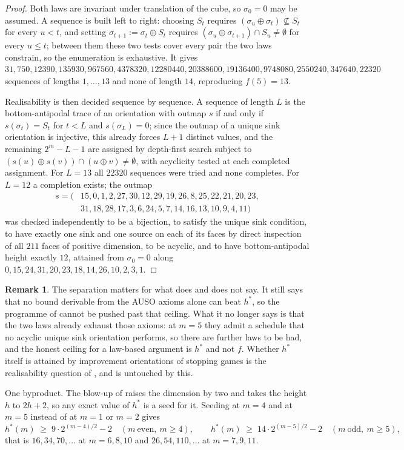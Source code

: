 \documentclass[11pt]{article}
\theoremstyle{plain}
\theoremstyle{definition}
\newtheorem{remark}[theorem]{Remark}
\begin{document}
\begin{proof}
Both laws are invariant under translation of the cube, so $\sigma_0=0$ may be
assumed. A sequence is built left to right: choosing $S_t$ requires
$(\sigma_u\oplus\sigma_t)\not\subseteq S_t$ for every $u<t$, and setting
$\sigma_{t+1}:=\sigma_t\oplus S_t$ requires
$(\sigma_u\oplus\sigma_{t+1})\cap S_u\ne\emptyset$ for every $u\le t$; between
them these two tests cover every pair the two laws constrain, so the
enumeration is exhaustive. It gives
$31,750,12390,135930,967560,4378320,12280440,20388600,19136400,9748080,2550240,
347640,22320$ sequences of lengths $1,\dots,13$ and none of length $14$,
reproducing $f(5)=13$.

Realisability is then decided sequence by sequence. A sequence of length $L$ is
the bottom-antipodal trace of an orientation with outmap $s$ if and only if
$s(\sigma_t)=S_t$ for $t<L$ and $s(\sigma_L)=0$; since the outmap of a unique
sink orientation is injective, this already forces $L+1$ distinct values, and
the remaining $2^{m}-L-1$ are assigned by depth-first search subject to
$(s(u)\oplus s(v))\cap(u\oplus v)\ne\emptyset$, with acyclicity tested at each
completed assignment. For $L=13$ all $22320$ sequences were tried and none
completes. For $L=12$ a completion exists; the outmap
\[
  \begin{aligned}
  s=(&15,0,1,2,27,30,12,29,19,26,8,25,22,21,20,23,\\
     &31,18,28,17,3,6,24,5,7,14,16,13,10,9,4,11)
  \end{aligned}
\]
was checked independently to be a bijection, to satisfy the unique sink
condition, to have exactly one sink and one source on each of its faces by
direct inspection of all $211$ faces of positive dimension, to be acyclic, and to have
bottom-antipodal height exactly $12$, attained from $\sigma_0=0$ along
$0,15,24,31,20,23,18,14,26,10,2,3,1$.
\end{proof}

\begin{remark}\label{rem:hstar-five}
The separation matters for what  does and does not say. It
still says that no bound derivable from the AUSO axioms alone can beat
$h^{\ast}$, so the programme of  cannot be pushed past that
ceiling. What it no longer says is that the two laws already exhaust those
axioms: at $m=5$ they admit a schedule that no acyclic unique sink orientation
performs, so there are further laws to be had, and the honest ceiling for a
law-based argument is $h^{\ast}$ and not $f$. Whether $h^{\ast}$ itself is
attained by improvement orientations of stopping games is the realisability
question of , and is untouched by this.

One byproduct. The blow-up of  raises the dimension by two
and takes the height $h$ to $2h+2$, so any exact value of $h^{\ast}$ is a seed
for it. Seeding at $m=4$ and at $m=5$ instead of at $m=1$ or $m=2$ gives
\[
  h^{\ast}(m)\;\ge\;9\cdot2^{(m-4)/2}-2\quad(m\ \text{even},\ m\ge4),
  \qquad
  h^{\ast}(m)\;\ge\;14\cdot2^{(m-5)/2}-2\quad(m\ \text{odd},\ m\ge5),
\]
that is $16,34,70,\dots$ at $m=6,8,10$ and $26,54,110,\dots$ at $m=7,9,11$.
\end{remark}
\end{document}
